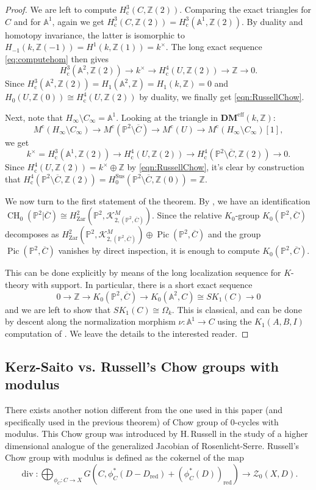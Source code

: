 \documentclass[11pt]{article}
\numberwithin{equation}{section}
\let\mathcal\mathscr
\newcommand{\rc}{\mathrm{c}}
\newcommand{\sus}{\mathrm{Sus}}
\theoremstyle{definition}
\newcommand{\sZ}{{\mathcal Z}}
\newcommand{\A}{{\mathbb A}}
\renewcommand{\P}{{\mathbb P}}
\newcommand{\Z}{{\mathbb Z}}
\DeclareMathOperator{\CH}{CH}
\DeclareMathOperator{\divf}{div}
\DeclareMathOperator{\Pic}{Pic}
\newcommand{\eff}{\mathrm{eff}}
\newcommand{\red}{\mathrm{red}}
\newcommand{\zar}{\mathrm{Zar}}
\let\ov\overline
\let\ol\ov
\begin{document}
\begin{proof}
We are left to compute $H_{\rc}^{3}(C, \Z(2))$. Comparing the exact triangles for $C$ and for $\A^1$, again we get $H_{\rc}^{3}(C, \Z(2)) = H_{\rc}^{3}(\A^1, \Z(2))$. By duality and homotopy invariance, the latter is isomorphic to $H_{-1}(k, \Z(-1)) = H^1(k, \Z(1)) = k^\times$. The long exact sequence \eqref{eq:computehom} then gives
\[ H_{\rc}^{3}(\A^2, \Z(2)) \to k^\times \to H_{\rc}^4(U, \Z(2)) \to \Z \to 0.\]
Since $H_{\rc}^{3}(\A^2, \Z(2)) = H_1(\A^2, \Z) = H_1(k, \Z) = 0$ and
$H_0(U, \Z(0)) \cong H_{\rc}^4(U, \Z(2))$ by duality, we finally get \eqref{eqn:RussellChow}.

Next, note that $H_\infty\setminus C_\infty = \A^1$. Looking at the triangle in
${\mathbf{DM}}^{\eff}(k, \Z)$:
\[ M^\rc(H_\infty\setminus C_\infty) \to M^\rc(\P^2\setminus \ol{C}) \to M^\rc(U) \to M^\rc(H_\infty\setminus C_\infty)[1],\]
we get
\[k^\times = H_{\rc}^{3}(\A^1, \Z(2)) \to H_{\rc}^4(U, \Z(2)) \to H_{\rc}^4(\P^2\setminus \ol{C}, \Z(2)) \to 0.\]
Since $H_{\rc}^4(U, \Z(2)) = k^\times\oplus \Z$ by \eqref{eqn:RussellChow}, it's clear by construction that $H_{\rc}^4(\P^2\setminus \ol{C}, \Z(2)) = H_0^{\sus}(\P^2 \setminus \ol{C}, \Z(0))=\Z$.

We now turn to the first statement of the theorem. By \cite[Th.\,1.1]{BKS},
we have an identification $\CH_0(\P^2|\ol{C}) \cong
H^2_{\zar}(\P^2, \mathcal{K}^M_{2, (\P^2, \ol{C})})$.
Since the relative $K_0$-group $K_0(\P^2, \ol{C})$ decomposes as
$H^2_{\zar}(\P^2, \mathcal{K}^M_{2, (\P^2, \ol{C})}) \oplus \Pic(\P^2, \ol{C})$ and the
group $\Pic(\P^2, \ol{C})$ vanishes by direct inspection, it is enough to compute
$K_0(\P^2, \ol{C})$.

This can be done explicitly by means of the long localization sequence for $K$-theory
with support. In particular, there is a short exact sequence
\[0\to \Z \to K_0(\P^2, \ol{C}) \to K_0(\A^2, C) \cong SK_1(C)\to 0\]
and we are left to show that $SK_1(C) \cong \Omega_{k}$. This is classical, and
can be done by descent along the normalization morphism $\nu\colon \A^1\to C$ using
the $K_1(A,B,I)$ computation of \cite{GW}. We leave the details to the interested
reader.
\end{proof}

\subsection{Kerz-Saito vs. Russell's Chow groups with modulus}
\label{sec:Russell}
There exists another notion different from the one used in this paper (and specifically used in the previous theorem) of Chow group of $0$-cycles with
modulus. This Chow group was introduced by H.\,Russell \cite{RussellANT} in the study of a higher dimensional analogue of the generalized Jacobian of Rosenlicht-Serre. Russell's Chow group with modulus is defined as the cokernel of the map
\[\divf\colon \bigoplus_{\phi_C\colon C\to X}G(C, \phi_C^*(D-D_{\red}) + (\phi_C^*(D))_{\red})\to \sZ_0(X,D).\]
\end{document}
